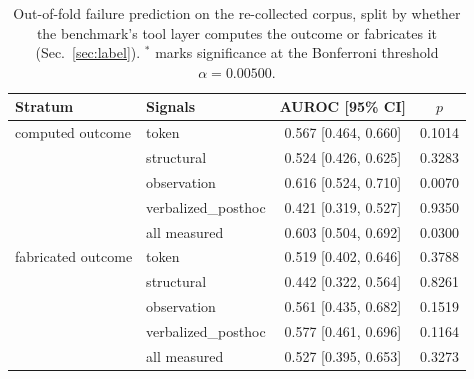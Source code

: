 \begin{table}[t]
\centering
\caption{Out-of-fold failure prediction on the re-collected corpus, split by whether the benchmark's tool layer computes the outcome or fabricates it (Sec.~\ref{sec:label}). $^{\ast}$ marks significance at the Bonferroni threshold $\alpha=0.00500$.}
\label{tab:v2strat}
\footnotesize
\begin{tabular}{llcc}
\toprule
\textbf{Stratum} & \textbf{Signals} & \textbf{AUROC [95\% CI]} & $p$ \\
\midrule
computed outcome & token & 0.567 [0.464, 0.660] & 0.1014 \\
 & structural & 0.524 [0.426, 0.625] & 0.3283 \\
 & observation & 0.616 [0.524, 0.710] & 0.0070 \\
 & verbalized_posthoc & 0.421 [0.319, 0.527] & 0.9350 \\
 & all measured & 0.603 [0.504, 0.692] & 0.0300 \\
\midrule
fabricated outcome & token & 0.519 [0.402, 0.646] & 0.3788 \\
 & structural & 0.442 [0.322, 0.564] & 0.8261 \\
 & observation & 0.561 [0.435, 0.682] & 0.1519 \\
 & verbalized_posthoc & 0.577 [0.461, 0.696] & 0.1164 \\
 & all measured & 0.527 [0.395, 0.653] & 0.3273 \\
\bottomrule
\end{tabular}
\end{table}
